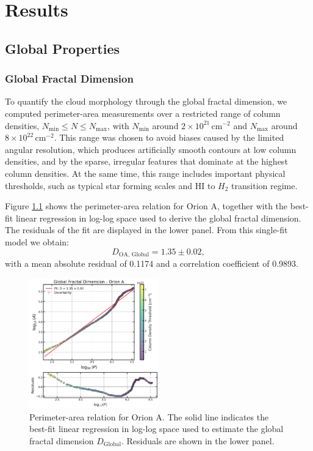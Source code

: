 \chapter{Results}
\label{ch:results}

\section{Global Properties}

\subsection{Global Fractal Dimension}

To quantify the cloud morphology through the global fractal dimension, we computed perimeter-area measurements over a restricted range of column densities, \(N_\mathrm{min} \leq N \leq N_\mathrm{max}\), with \(N_\mathrm{min}\) around \(2 \times 10^{21}\,\mathrm{cm}^{-2}\) and \(N_\mathrm{max}\) around \(8 \times 10^{22}\,\mathrm{cm}^{-2}\). This range was chosen to avoid biases caused by the limited angular resolution, which produces artificially smooth contours at low column densities, and by the sparse, irregular features that dominate at the highest column densities. At the same time, this range includes important physical thresholds, such as typical star forming scales and HI to $H_2$ transition regime.

Figure \ref{fig:orion_A_global} shows the perimeter-area relation for Orion A, together with the best-fit linear regression in log-log space used to derive the global fractal dimension. The residuals of the fit are displayed in the lower panel. From this single-fit model we obtain:
\[
D_{\mathrm{OA,\,Global}} = 1.35 \pm 0.02 ,
\]
with a mean absolute residual of 0.1174 and a correlation coefficient of 0.9893.

\begin{figure}[t]
    \centering
    \includegraphics[width=0.5\textwidth]{figures/orion_A_global.png}
    \caption{Perimeter-area relation for Orion A. The solid line indicates the best-fit linear regression in log-log space used to estimate the global fractal dimension \(D_{\mathrm{Global}}\). Residuals are shown in the lower panel.}
    \label{fig:orion_A_global}
\end{figure}

